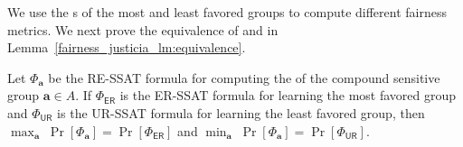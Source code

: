 \noindent\makebox[\linewidth]{\rule{\paperwidth}{2.5pt}}


We use the s of the most and least favored groups to compute different fairness metrics. We next prove the equivalence of {\justiciaenum} and {\justicialearn} in Lemma~\ref{fairness_justicia_lm:equivalence}.

\begin{lemma}
	\label{fairness_justicia_lm:equivalence}
	Let $ \Phi_{\mathbf{a}} $ be the RE-SSAT formula for computing the  of the compound sensitive group $ \mathbf{a} \in A $. If $ \Phi_{\mathsf{ER}} $ is the ER-SSAT formula for learning the most favored group and $ \Phi_{\mathsf{UR}} $ is the UR-SSAT formula for learning the least favored group, then
	$\max_{\mathbf{a}} \; \Pr[\Phi_{\mathbf{a}}] = \Pr[\Phi_{\mathsf{ER}}]$   
	and
	$\min_{\mathbf{a}} \; \Pr[\Phi_{\mathbf{a}}] = \Pr[\Phi_{\mathsf{UR}}]$.   
\end{lemma}
\iffalse
\begin{theorem}
	For an ER-SSAT problem, the na\"ive sample complexity is given by 
	\[ k = O\left(\frac{1}{\epsilon^2} (n + \ln(1/\delta))  \right)\]
	where $\hat{p} - p \leq \epsilon$ with probability $1-\delta$.
\end{theorem}
\red{For a simple sampling based algo after evaluating $k$ assignments, the error between estimates probability and actual probability would differ by $\epsilon$ with probability $1- 2^{n+1} e^{-2\epsilon^2 k}$. So the sample complexity of a naive algo is $k = O(\epsilon^{-2} (\log(1/\delta) + n))$.}
\fi




